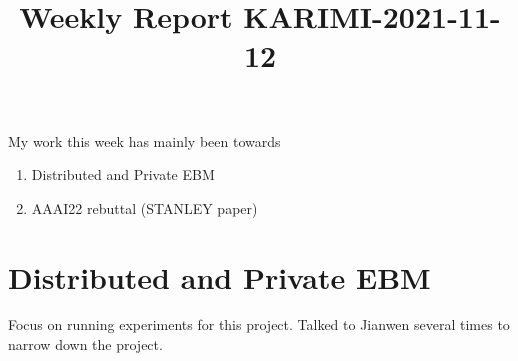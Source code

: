 \documentclass{article}
\begin{document}
\title{Weekly Report KARIMI-2021-11-12}


\date{}
\maketitle

\vspace{-0.5in}


My work this week has mainly been towards
\begin{enumerate}
\item Distributed and Private EBM
\item AAAI22 rebuttal (STANLEY paper)
\end{enumerate}

\section{Distributed and Private EBM}
Focus on running experiments for this project.
Talked to Jianwen several times to narrow down the project.
\end{document}
